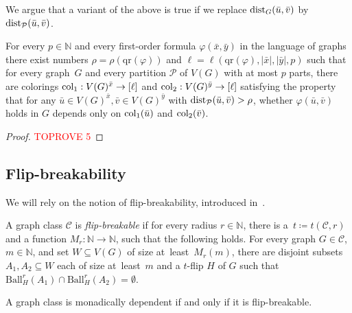 \documentclass[a4paper,UKenglish,cleveref, autoref, thm-restate]{lipics-v2021}
\newcommand{\qr}{\mathrm{qr}}
\newcommand{\N}[0]{\mathrm{\mathbb{N}}}
\newcommand{\col}{\textnormal{col}}
\newcommand{\dist}{\textnormal{dist}}
\renewcommand{\phi}{\varphi}
\newcommand{\CC}{\mathcal{C}}
\newcommand{\PP}{\mathcal{P}}
\newcommand{\Ball}{\mathrm{Ball}}
\begin{document}
We argue that a variant of the above is true if we replace $\dist_G(\bar u, \bar v)$ by $\dist_{\PP}(\bar u, \bar v)$.

\begin{lemma}\label{lem:partition-gaifman}
    For every $p \in\N$ and every first-order formula $\phi(\bar x, \bar y)$ in the language of graphs there exist numbers $\rho = \rho(\qr(\phi))$ and $\ell = \ell(\qr(\phi), |\bar x|, |\bar y|, p)$ such that for every graph~$G$ and every partition $\PP$ of $V(G)$ with at most $p$ parts, there are colorings $\col_1:V(G)^{\bar x} \to [\ell]$ and $\col_2: V(G)^{\bar y} \to [\ell]$ satisfying the property that for any  $\bar u \in V(G)^{\bar x}, \bar v \in V(G)^{\bar y}$ with $\dist_\PP(\bar u, \bar v) > \rho$, whether $\phi(\bar u, \bar v)$ holds in $G$ depends only on $\col_1(\bar u)$ and $\col_2(\bar v)$.
  \end{lemma}

\begin{proof}\textcolor{red}{TOPROVE 5}\end{proof}
  


 

\subsection{Flip-breakability}

We will rely on the notion of flip-breakability, introduced in~\cite{flip-breakability}.

\begin{definition}\label{def:flip-breakable}
    A graph class $\CC$ is \emph{flip-breakable} if for every radius $r\in \N$, there is a~$t \coloneqq t(\CC,r)$ and a function $M_r : \N \to \N$, such that the following holds.
    For every graph $G\in\CC$, $m\in\N$, and set $W \subseteq V(G)$ of size at~least~$M_r(m)$, there are disjoint subsets $A_1, A_2 \subseteq W$ each of size at~least~$m$ and a $t$-flip $H$ of $G$ such that $\Ball_H^r(A_1) \cap \Ball_H^r(A_2) = \emptyset$.
\end{definition}

\begin{theorem}
    A graph class is monadically dependent if and only if it is flip-breakable.
\end{theorem}
\end{document}
